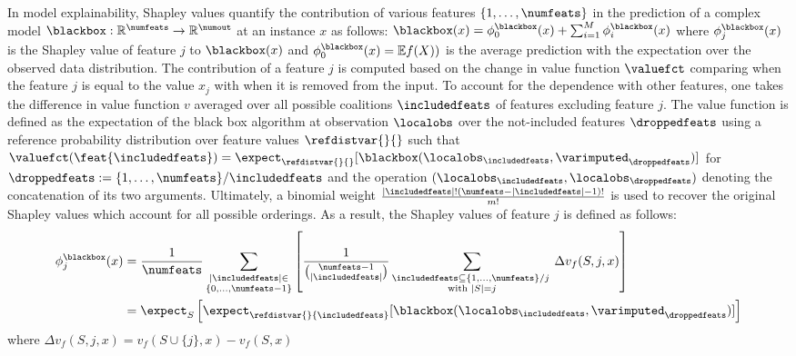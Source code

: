 \documentclass[nohyperref]{article}
\theoremstyle{plain}
\theoremstyle{definition}
\theoremstyle{remark}
\begin{document}
In model explainability, Shapley values quantify the contribution of various features $\{1,\ldots,\numfeats\}$ in the prediction of a complex model $\blackbox:\mathbb{R}^{\numfeats}\rightarrow\mathbb{R}^{\numout}$ at an instance $x$ as follows: $\blackbox(x)=\phi^{\blackbox}_{0}(x)+\sum_{i=1}^{M} \phi^{\blackbox}_{i}(x)$ where $\phi^{\blackbox}_{j}(x)$ is the Shapley value of feature $j$ to $\blackbox(x)$ and $\phi^{\blackbox}_{0}(x)=\mathbb{E} f(X))$ is the average prediction with the expectation over the observed data distribution. The contribution of a feature $j$ is computed based on the change in value function $\valuefct$ comparing when the feature $j$ is equal to the value $x_j$ with when it is removed from the input. To account for the dependence with other features, one takes the difference in value function $v$ averaged over all possible coalitions $\includedfeats$ of features excluding feature $j$. The value function is defined as the expectation of the black box algorithm at observation $\localobs$ over the not-included features $\droppedfeats$ using a reference probability distribution over feature values $\refdistvar{}{}$ such that $\valuefct(\feat{\includedfeats})=\expect_{\refdistvar{}{}}[\blackbox({\localobs_{\includedfeats}, \varimputed_{\droppedfeats}})]$ for $\droppedfeats:=\{1,\ldots,\numfeats\}/\includedfeats$ and the operation $({\localobs_{\includedfeats}, \localobs_{\droppedfeats}})$ denoting the concatenation of its two arguments. Ultimately, a binomial weight $\frac{{|\includedfeats|!(\numfeats-|\includedfeats|-1)!}}{m!}$ is used to recover the original Shapley values which account for all possible orderings. As a result, the Shapley values of feature $j$ is defined as follows:
\vspace*{-0.3cm}
\begin{align*}
    \phi_j^\blackbox(x) 
    &=   \frac{1}{\numfeats} \sum_{\substack{|\includedfeats|\in \\ \{0,\ldots,\numfeats-1\}}} \left[\frac{1}{\binom{\numfeats-1}{|\includedfeats|}} \sum_{\substack{\includedfeats\subseteq \{1,\ldots,\numfeats\}/j\; \\\text{with }|S|=j}} \Delta v_f(S, j, x)\right] \\
    &= \expect_{S}\left[\expect_{\refdistvar{}{\includedfeats}}[\blackbox({\localobs_{\includedfeats}, \varimputed_{\droppedfeats}})]\right]
\end{align*}
where $\Delta v_f(S, j, x) = v_f(S \cup \{j\}, x) - v_f(S, x)$
\end{document}
